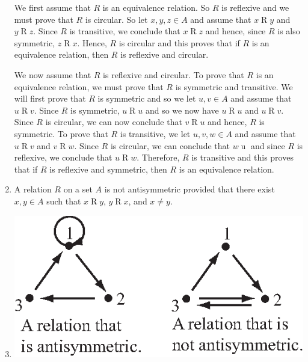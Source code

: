 \documentclass[11pt]{article}
\begin{document}
\begin{enumerate}
\begin{myproof}
We first assume that $R$ is an equivalence relation.  So $R$ is reflexive and we must prove that $R$ is circular.  So let $x, y, z \in A$ and assume that $x \mathrel{R} y$ and $y \mathrel{R} z$.  Since $R$ is transitive, we conclude that $x \mathrel{R} z$ and hence, since $R$ is also symmetric, $z \mathrel{R} x$.  Hence, $R$ is circular and this proves that if $R$ is an equivalence relation, then $R$ is reflexive and circular.

We now assume that $R$ is reflexive and circular.  To prove that $R$ is an equivalence relation, we must prove that $R$ is symmetric and transitive.  We will first prove that $R$ is symmetric and so we let $u,v \in A$ and assume that $u \mathrel{R} v$.  Since $R$ is symmetric, $u \mathrel{R} u$ and so we now have $u \mathrel{R} u$ and $u \mathrel{R} v$.  Since $R$ is circular, we can now conclude that $v \mathrel{R} u$ and hence, $R$ is symmetric.  To prove that $R$ is transitive, we let $u, v, w \in A$ and assume that $u \mathrel{R} v$ and 
$v \mathrel{R} w$.  Since $R$ is circular, we can conclude that $w \mathrel u$ and since $R$ is reflexive, we conclude that $u \mathrel{R} w$.  Therefore, $R$ is transitive and this proves that if $R$ is reflexive and symmetric, then $R$ is an equivalence relation.
\end{myproof}



\item A relation $R$ on a set $A$ is not antisymmetric provided that there exist $x, y \in A$ such that $x \mathrel{R} y$, $y \mathrel{R} x$, and $x \ne y$.

\newpage
\item \qquad

\begin{center}
\includegraphics{fig-sec72-3.eps}
\end{center}




\end{enumerate}
\end{document}
